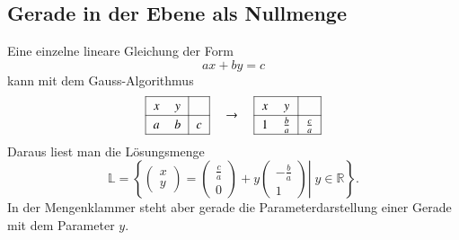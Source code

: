 %
%
%
\subsection{Gerade in der Ebene als Nullmenge}
Eine einzelne lineare Gleichung der Form 
\[
ax+by=c
\]
kann mit dem Gauss-Algorithmus
\[
\begin{tabular}{|>{$}c<{$} >{$}c<{$}|>{$}c<{$}|}
\hline
x&y&\\
\hline
a&b&c\\
\hline
\end{tabular}
\quad\rightarrow\quad
{
\def\arraystretch{1.2}
\begin{tabular}{|>{$}c<{$} >{$}c<{$}|>{$}c<{$}|}
\hline
x&y&\\
\hline
1&\frac{b}{a}&\frac{c}{a}\\
\hline
\end{tabular}
}
\]
Daraus liest man die Lösungsmenge
\[
\mathbb L
=
\left\{
\left.
\begin{pmatrix} x\\ y \end{pmatrix}
=
\begin{pmatrix} \frac{c}{a}\\0 \end{pmatrix}
+
y\begin{pmatrix} -\frac{b}{a} \\ 1 \end{pmatrix}
\right|
\;
y\in\mathbb R
\right\}.
\]
In der Mengenklammer steht aber gerade die Parameterdarstellung
einer Gerade mit dem Parameter $y$.

